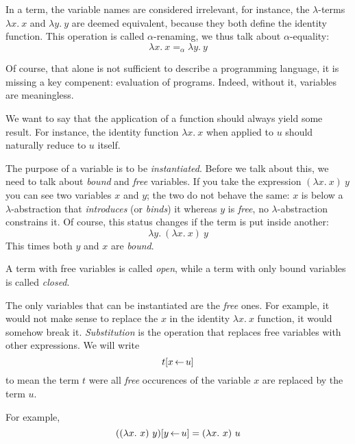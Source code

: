In a term, the variable names are considered irrelevant, for instance, the
\(\lambda\)-terms \(\lambda x.\ x\) and \(\lambda y.\ y\) are deemed equivalent,
because they both define the identity function.
This operation is called \(\alpha\)-renaming, we thus talk about
\(\alpha\)-equality:
\[
  \lambda x.\ x =_\alpha \lambda y.\ y
\]

Of course, that alone is not sufficient to describe a programming language,
it is missing a key compenent: evaluation of programs.
Indeed, without it, variables are meaningless.

We want to say that the application of a function should always yield some
result. For instance, the identity function \(\lambda x.\ x\) when applied to
\(u\) should naturally reduce to \(u\) itself.

The purpose of a variable is to be \emph{instantiated}.
Before we talk about this, we need to talk about \emph{bound} and \emph{free}
variables.
If you take the expression \((\lambda x.\ x)\ y\) you can see two variables
\(x\) and \(y\); the two do not behave the same: \(x\) is below a
\(\lambda\)-abstraction that \emph{introduces} (or \emph{binds}) it whereas
\(y\) is \emph{free}, no \(\lambda\)-abstraction constrains it.
Of course, this status changes if the term is put inside another:
\[
  \lambda y.\ (\lambda x.\ x)\ y
\]
This times both \(y\) and \(x\) are \emph{bound}.

A term with free variables is called \emph{open}, while a term with only bound
variables is called \emph{closed}.

The only variables that can be instantiated are the \emph{free} ones.
For example, it would not make sense to replace the \(x\) in the identity
\(\lambda x.\ x\) function, it would somehow break it. \emph{Substitution} is
the operation that replaces free variables with other expressions.
We will write
\[
  t[x \mathop{\leftarrow} u]
\]
to mean the term \(t\) were all \emph{free} occurences of the variable \(x\)
are replaced by the term \(u\).

For example,
\[
  ((\lambda x.\ x)\ y)[y \mathop{\leftarrow} u] = (\lambda x.\ x)\ u
\]

